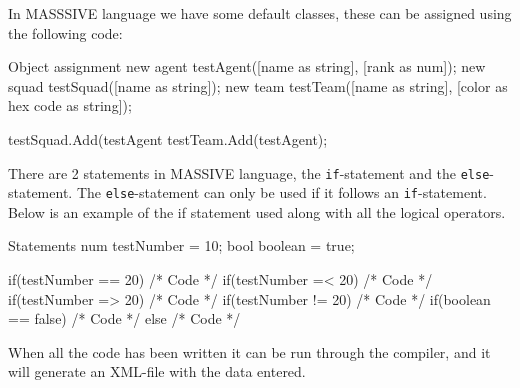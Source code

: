 In MASSSIVE language we have some default classes, these can be assigned using the following code:
\begin{source}{Object assignment}{}
new agent testAgent([name as string], [rank as num]);
new squad testSquad([name as string]);
new team testTeam([name as string], [color as hex code as string]);

testSquad.Add(testAgent
testTeam.Add(testAgent);
\end{source}

There are 2 statements in MASSIVE language, the \texttt{if}-statement and the \texttt{else}-statement. The \texttt{else}-statement can only be used if it follows an \texttt{if}-statement. Below is an example of the if statement used along with all the logical operators.

\begin{source}{Statements}{}
num testNumber = 10;
bool boolean = true;

if(testNumber == 20)
{
		/* Code */
}
if(testNumber =< 20)
{
		/* Code */
}
if(testNumber => 20)
{
		/* Code */
}
if(testNumber != 20)
{
		/* Code */
}
if(boolean == false)
{
		/* Code */
}
else
{
		/* Code */
}
\end{source}

When all the code has been written it can be run through the compiler, and it will generate an XML-file with the data entered.